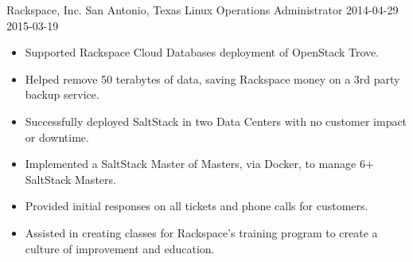 \roleheader
    {Rackspace, Inc.}
    {San Antonio, Texas}
    {Linux Operations Administrator }
    {2014-04-29}
    {2015-03-19}

\begin{itemize} \itemsep 0pt
    \item Supported Rackspace Cloud Databases deployment of OpenStack Trove.
    \item Helped remove 50 terabytes of data, saving Rackspace money on a 3rd party backup service.
    \item Successfully deployed SaltStack in two Data Centers with no customer impact or downtime.
    \item Implemented a SaltStack Master of Masters, via Docker, to manage 6+ SaltStack Masters.
    \item Provided initial responses on all tickets and phone calls for customers.
    \item Assisted in creating classes for Rackspace’s training program to create a culture of improvement and education.
\end{itemize}